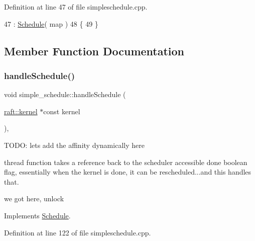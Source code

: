 Definition at line 47 of file simpleschedule.\+cpp.


\begin{DoxyCode}
47                                                : \hyperlink{class_schedule_ae3fcf18fa8bdbe2ac438962a324cf433}{Schedule}( map )
48 \{
49 \}
\end{DoxyCode}


\subsection{Member Function Documentation}
\hypertarget{classsimple__schedule_aafebb0cc13b4539387790ff54ea40830}{}\label{classsimple__schedule_aafebb0cc13b4539387790ff54ea40830} 
\subsubsection{\texorpdfstring{handle\+Schedule()}{handleSchedule()}}
{\footnotesize\ttfamily void simple\+\_\+schedule\+::handle\+Schedule (\begin{DoxyParamCaption}\item[{\hyperlink{classraft_1_1kernel}{raft\+::kernel} $\ast$const}]{kernel }\end{DoxyParamCaption})\hspace{0.3cm}{\ttfamily [protected]}, {\ttfamily [virtual]}}

T\+O\+DO\+: lets add the affinity dynamically here

thread function takes a reference back to the scheduler accessible done boolean flag, essentially when the kernel is done, it can be rescheduled...and this handles that.

we got here, unlock 

Implements \hyperlink{class_schedule}{Schedule}.



Definition at line 122 of file simpleschedule.\+cpp.


